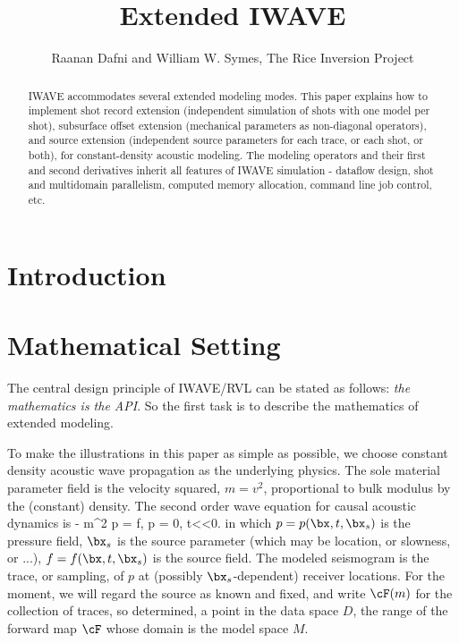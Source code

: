 \title{Extended IWAVE}
\date{}
\author{Raanan Dafni and William W. Symes, The Rice Inversion Project}


\maketitle
\parskip 12pt
\begin{abstract}
IWAVE accommodates several extended modeling modes. This paper explains how to implement  shot record extension (independent simulation of shots with one model per shot), subsurface offset extension (mechanical parameters as non-diagonal operators), and source extension (independent source parameters for each trace, or each shot, or both), for constant-density acoustic modeling. The modeling operators and their first and second derivatives inherit all features of IWAVE simulation - dataflow design, shot and multidomain parallelism, computed memory allocation, command line job control, etc.  
\end{abstract}

\section{Introduction}

\section{Mathematical Setting}
The central design principle of IWAVE/RVL can be stated as follows: {\em the mathematics is the API}. So the first task is to describe the mathematics of extended modeling. 

To make the illustrations in this paper as simple as possible, we choose constant density acoustic wave propagation as the underlying physics. The sole material parameter field is the velocity squared, $m=v^2$, proportional to bulk modulus by the (constant) density. The second order wave equation for causal acoustic dynamics is
\be
\label{awe}
 - m\nabla^2 p = f,\,\,p = 0, t<<0.
\ee
in which $p=p(\bx,t,\bx_s)$ is the pressure field, $\bx_s$ is the source parameter (which may be location, or slowness, or ...), $f = f(\bx,t,\bx_s)$ is the source field. The modeled seismogram is the trace, or sampling, of $p$ at (possibly $\bx_s$-dependent) receiver locations. For the moment, we will regard the source as known and fixed, and write $\cF(m)$ for the collection of traces, so determined, a point in the data space $D$, the range of the forward map $\cF$ whose  domain is the model space $M$.

